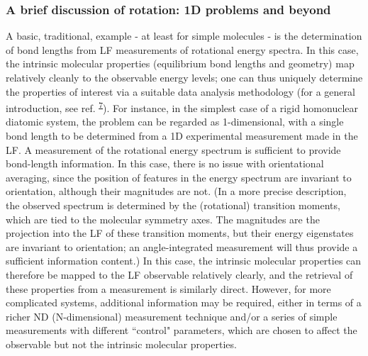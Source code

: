 \documentclass[10pt]{article}
\begin{document}
\subsubsection{A brief discussion of rotation: 1D problems and beyond\label{sec:1D-case}}

A basic, traditional, example - at least for simple molecules - is the determination of bond lengths from LF measurements of rotational energy spectra. In this case, the intrinsic molecular properties (equilibrium bond lengths and geometry) map relatively cleanly to the observable energy levels; one can thus uniquely determine the properties of interest via a suitable data analysis methodology (for a general introduction, see ref. \textsuperscript{\hyperref[csl:7]{7}}). For instance, in the simplest case of a rigid homonuclear diatomic system, the problem can be regarded as 1-dimensional, with a single bond length to be determined from a 1D experimental measurement made in the LF. A measurement of the rotational energy spectrum is sufficient to provide bond-length information. In this case, there is no issue with orientational averaging, since the position of features in the energy spectrum are invariant to orientation, although their magnitudes are not. 
(In a more precise description, the observed spectrum is determined by the (rotational) transition moments, which are tied to the molecular symmetry axes. The magnitudes are the projection into the LF of these transition moments, but their energy eigenstates are invariant to orientation; an angle-integrated measurement will thus provide a sufficient information content.)
In this case, the intrinsic molecular properties can therefore be mapped to the LF observable relatively clearly, and the retrieval of these properties from a measurement is similarly direct. However, for more complicated systems, additional information may be required, either in terms of a richer ND (N-dimensional) measurement technique and/or a series of simple measurements with different ``control" parameters, which are chosen to affect the observable but not the intrinsic molecular properties.

\end{document}
